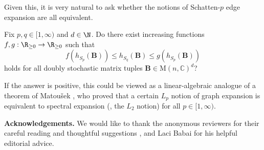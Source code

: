 \documentclass{toc}
\renewcommand{\paragraph}[1]{\vspace{6pt} \noindent \textbf{#1}\xspace}
\theoremstyle{plain}
\numberwithin{equation}{section}
\theoremstyle{definition}
\newcommand{\bC}{\mathbb{C}}
\newcommand{\M}{\mathrm{M}}
\newcommand{\tuple}[1]{\mathbf{#1}}
\newcommand{\vB}{\tuple{B}}
\begin{document}
Given this, it is very natural to ask whether the notions of Schatten-$p$ edge expansion are all equivalent.
\begin{question}
    Fix $p,q \in [1,\infty)$ and $d \in \N$. Do there exist increasing functions $f,g:\R_{\geq 0} \to \R_{\geq 0}$ such that
    \[
        f(h_{S_p}(\vB)) \leq h_{S_q}(\vB) \leq g(h_{S_p}(\vB))
    \]
    holds for all doubly stochastic matrix tuples $\vB \in \M(n,\bC)^d$?
\end{question}
If the answer is positive, this could be viewed as a linear-algebraic analogue of a theorem of Matou\v sek \cite{Matousek97}, who proved that a certain $L_p$ notion of graph expansion is equivalent to spectral expansion (\ie, the $L_2$ notion) for all $p \in [1,\infty)$.

\paragraph{Acknowledgements.} We would like to %
thank  %
the anonymous reviewers for their careful reading and thoughtful suggestions%
, and Laci Babai for his helpful editorial advice. 
%


%



%
%
%

\end{document}

